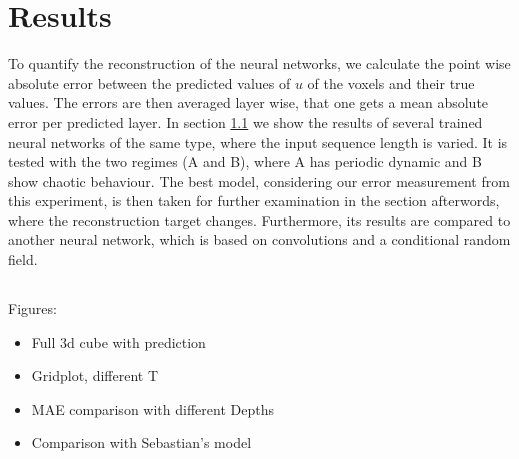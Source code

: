 \section{Results}

To quantify the reconstruction of the neural networks, we calculate the point wise absolute error between the predicted values of $u$ of the voxels and their true values. The errors are then averaged layer wise, that one gets a mean absolute error per predicted layer. In section \ref{sec:T} we show the results of several trained neural networks of the same type, where the input sequence length is varied. It is tested with the two regimes (A and B), where A has periodic dynamic and B show chaotic behaviour. The best model, considering our error measurement from this experiment, is then taken for further examination in the section afterwords, where the reconstruction target changes. Furthermore, its results are compared to another neural network, which is based on convolutions and a conditional random field.

\subsection{}\label{sec:T}

Figures:
\begin{itemize}
    \item Full 3d cube with prediction
    \item Gridplot, different T
    \item MAE comparison with different Depths
    \item Comparison with Sebastian's model
\end{itemize}




